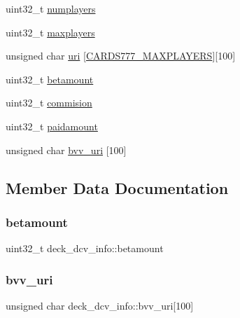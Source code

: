 \begin{DoxyCompactItemize}
\item 
uint32\+\_\+t \hyperlink{structdeck__dcv__info_a533796e39e541718a2aab0d61414612b}{numplayers}
\item 
uint32\+\_\+t \hyperlink{structdeck__dcv__info_a95db599c4f330024040c6c9b7c46d5ef}{maxplayers}
\item 
unsigned char \hyperlink{structdeck__dcv__info_ac019b3b109ead05c7d6d76846603399b}{uri} \mbox{[}\hyperlink{common_8h_a97d6188fd175f4ea7268e9445107a7c0}{C\+A\+R\+D\+S777\+\_\+\+M\+A\+X\+P\+L\+A\+Y\+E\+RS}\mbox{]}\mbox{[}100\mbox{]}
\item 
uint32\+\_\+t \hyperlink{structdeck__dcv__info_abf784ce3b599f9ca61608210559c56f9}{betamount}
\item 
uint32\+\_\+t \hyperlink{structdeck__dcv__info_a49c38791b251048ff83d948f76154441}{commision}
\item 
uint32\+\_\+t \hyperlink{structdeck__dcv__info_a7cf6f1023e1245a8b19b87f63fa64e7a}{paidamount}
\item 
unsigned char \hyperlink{structdeck__dcv__info_a1415902499c43e3c0a4ba1f75fbdfeaf}{bvv\+\_\+uri} \mbox{[}100\mbox{]}
\end{DoxyCompactItemize}


\subsection{Member Data Documentation}
\mbox{\label{structdeck__dcv__info_abf784ce3b599f9ca61608210559c56f9}} 
\subsubsection{\texorpdfstring{betamount}{betamount}}
{\footnotesize\ttfamily uint32\+\_\+t deck\+\_\+dcv\+\_\+info\+::betamount}

\mbox{\label{structdeck__dcv__info_a1415902499c43e3c0a4ba1f75fbdfeaf}} 
\subsubsection{\texorpdfstring{bvv\+\_\+uri}{bvv\_uri}}
{\footnotesize\ttfamily unsigned char deck\+\_\+dcv\+\_\+info\+::bvv\+\_\+uri\mbox{[}100\mbox{]}}

